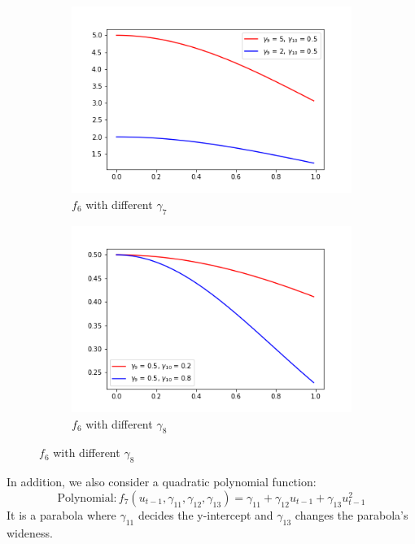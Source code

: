 \documentclass[a4paper,12pt,times,numbered,print,index]{report}
\numberwithin{equation}{section}
\begin{document}
\begin{figure}[!htbp]
	\centering
	\caption{$f_{6}\left(x_{t-1}^{\prime }\theta _{0},\gamma_{0}\right)$ with different $\gamma$}
	\begin{subfigure}[b]{0.44\linewidth}
		\includegraphics[width=\linewidth]{plots/scale_exp_g9.png}
		\caption{$f_{6}$ with different $\gamma_{7}$}
		\label{param_g9}
	\end{subfigure}
	\begin{subfigure}[b]{0.44\linewidth}
		\includegraphics[width=\linewidth]{plots/scale_exp_g10.png}
		\caption{$f_{6}$ with different $\gamma_{8}$}
		\label{param_g10}
	\end{subfigure}
	\label{exp2}
\end{figure}

In addition, we also consider a quadratic polynomial function:
$$
\text{Polynomial}: f_{7}\left( u_{t-1},\gamma_{11}, \gamma_{12}, \gamma_{13}\right) = \gamma_{11}+ \gamma_{12}u_{t-1}+\gamma_{13}u_{t-1}^{2}
$$
It is a parabola where $\gamma_{11}$ decides the y-intercept and $\gamma_{13}$ changes the parabola's wideness.
\end{document}
